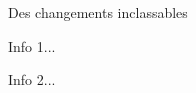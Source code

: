 \begin{bdoctopic}{Des changements inclassables}
    \item Info 1...
    \item Info 2...
\end{bdoctopic}
